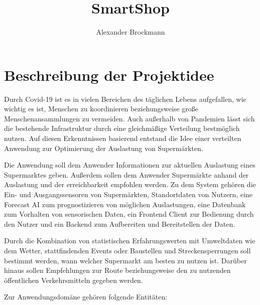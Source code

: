\documentclass[runningheads]{llncs}
\begin{document}
%
\title{SmartShop}
%
%
\author{Alexander Brockmann}
%
%


%
\maketitle              %

\section{Beschreibung der Projektidee}
Durch Covid-19 ist es in vielen Bereichen des täglichen Lebens aufgefallen, wie wichtig es ist, Menschen zu koordinieren beziehungsweise große Menschenansammlungen zu vermeiden.
Auch außerhalb von Pandemien lässt sich die bestehende Infrastruktur durch eine gleichmäßige Verteilung bestmöglich nutzen.
Auf diesen Erkenntnissen basierend entstand die Idee einer verteilten Anwendung zur Optimierung der Auslastung von Supermärkten.

Die Anwendung soll dem Anwender Informationen zur aktuellen Auslastung eines Supermarktes geben.
Außerdem sollen dem Anwender Supermärkte anhand der Auslastung und der erreichbarkeit empfohlen werden.
Zu dem System gehören die Ein- und Ausgangssensoren von Supermärkten, Standortdaten von Nutzern, eine Forecast AI zum prognostizieren von möglichen Auslastungen, eine Datenbank zum Vorhalten von sensorischen Daten, ein Frontend Client zur Bedienung durch den Nutzer und ein Backend zum Aufbereiten und Bereitstellen der Daten.

Durch die Kombination von statistischen Erfahrungswerten mit Umweltdaten wie dem Wetter, stattfindenden Events oder Baustellen und Streckensperrungen soll bestimmt werden, wann welcher Supermarkt am besten zu nutzen ist.
Darüber hinaus sollen Empfehlungen zur Route beziehungsweise den zu nutzenden öffentlichen Verkehrsmitteln gegeben werden.

Zur Anwendungsdomäne gehören folgende Entitäten:
\end{document}
